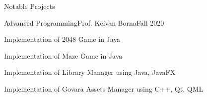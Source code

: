\documentclass[]{main}
\begin{document}
\begin{section}{Notable Projects}
 \begin{subsection}{Advanced Programming}{Prof. Keivan Borna}{Fall 2020}{}
     \item Implementation of 2048 Game in Java \;\href{https://github.com/ckoliber/2048}{\faExternalLink*}
     \item Implementation of Maze Game in Java \;\href{https://github.com/ckoliber/Maze}{\faExternalLink*}
     \item Implementation of Library Manager using Java, JavaFX \;\href{https://github.com/ckoliber/LibraryManager}{\faExternalLink*}
     \item Implementation of Govara Assets Manager using C++, Qt, QML \;\href{https://github.com/ckoliber/govara}{\faExternalLink*}
 \end{subsection}
\end{section}
\end{document}
